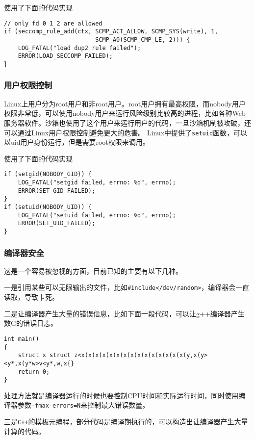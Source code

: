 使用了下面的代码实现

\begin{verbatim}
// only fd 0 1 2 are allowed
if (seccomp_rule_add(ctx, SCMP_ACT_ALLOW, SCMP_SYS(write), 1, 
                          SCMP_A0(SCMP_CMP_LE, 2))) {
    LOG_FATAL("load dup2 rule failed");
    ERROR(LOAD_SECCOMP_FAILED);
}
\end{verbatim}

\subsubsection{用户权限控制}

Linux上用户分为root用户和非root用户。root用户拥有最高权限，而nobody用户权限非常低，可以使用nobody用户来运行风险级别比较高的进程，比如各种Web服务器软件。沙箱也使用了这个用户来运行用户的代码，一旦沙箱机制被攻破，还可以通过Linux用户权限控制避免更大的危害。
Linux中提供了\texttt{setuid}函数，可以以uid用户身份运行，但是需要root权限来调用。

使用了下面的代码实现

\begin{verbatim}
if (setgid(NOBODY_GID)) {
    LOG_FATAL("setgid failed, errno: %d", errno);
    ERROR(SET_GID_FAILED);
}
if (setuid(NOBODY_UID)) {
    LOG_FATAL("setuid failed, errno: %d", errno);
    ERROR(SET_UID_FAILED);
}
\end{verbatim}

\subsubsection{编译器安全}

这是一个容易被忽视的方面，目前已知的主要有以下几种。

一是引用某些可以无限输出的文件，比如\texttt{\#include</dev/random>}，编译器会一直读取，导致卡死。

二是让编译器产生大量的错误信息，比如下面一段代码，可以让g++编译器产生数G的错误日志。

\begin{verbatim}
int main()
{
    struct x struct z<x(x(x(x(x(x(x(x(x(x(x(x(x(x(x(y,x(y><y*,x(y*w>v<y*,w,x{}
    return 0;
}
\end{verbatim}

处理方法就是编译器运行的时候也要控制CPU时间和实际运行时间，同时使用编译器参数\texttt{-fmax-errors=N}来控制最大错误数量。

三是\texttt{C++}的模板元编程，部分代码是编译期执行的，可以构造出让编译器产生大量计算的代码。

